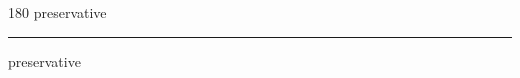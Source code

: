 
\begin{frame}
\begin{center}
\begin{turn}{180}
{\fontsize{2.5cm}{1em}\selectfont preservative}
\end{turn}
\vspace{1em}\par  
\hrule
\vspace{1em}\par  
{\fontsize{2.5cm}{1em}\selectfont preservative}
\end{center}
\end{frame}
